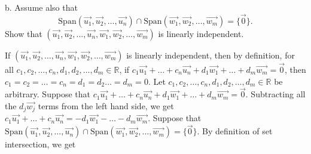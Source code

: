 \documentclass[12pt]{article}
\newenvironment{problem}[2][Problem]
{
	\begin{trivlist} 
		\item[\hskip \labelsep {\bfseries #1 #2:}]
	}
{
	\end{trivlist}
	}
\newenvironment{solution}[1][Solution]
{
	\begin{trivlist} 
		\item[\hskip \labelsep {\itshape #1:}]
	}
	{
	\end{trivlist}
}
\begin{document}
\begin{problem}{3}
\begin{solution}
%
%
%
%
%
%
%
%
%
\end{solution}
\noindent
\newline
\newline
b. Assume also that
\[
\text{Span}(\vec{u_1},\vec{u_2}, \dots , \vec{u_n}) \cap \text{Span}(\vec{w_1},\vec{w_2}, \dots , \vec{w_m}) = \{\vec{0}\}\text{.}
\]
Show that $(\vec{u_1},\vec{u_2}, \dots , \vec{u_n},\vec{w_1},\vec{w_2}, \dots , \vec{w_m})$ is linearly independent.
\begin{solution} If $(\vec{u_1},\vec{u_2}, \dots , \vec{u_n},\vec{w_1},\vec{w_2}, \dots , \vec{w_m})$ is linearly independent, then by definition, for all $c_1,c_2,\dots,c_n,d_1,d_2,\dots,d_m \in \mathbb{R}$, if $c_1\vec{u_1} + \dots + c_n \vec{u_n} + d_1 \vec{w_1} +\dots + d_m \vec{w_m} = \vec{0}$, then $c_1=c_2=\dots=c_n=d_1=d_2\dots=d_m=0$. Let $c_1,c_2,\dots,c_n,d_1,d_2,\dots,d_m \in \mathbb{R}$ be arbitrary. Suppose that $c_1\vec{u_1} + \dots + c_n \vec{u_n} + d_1 \vec{w_1} +\dots + d_m \vec{w_m} = \vec{0}$. Subtracting all the $d_j\vec{w_j}$ terms from the left hand side, we get $c_1 \vec{u_1} + \dots + c_n \vec{u_n} = -d_1 \vec{w_1} - \dots -d_m \vec{w_m}$. Suppose that $\text{Span}(\vec{u_1},\vec{u_2}, \dots , \vec{u_n}) \cap \text{Span}(\vec{w_1},\vec{w_2}, \dots , \vec{w_m}) = \{\vec{0}\}$. By definition of set intersection, we get

\end{solution}
\end{problem}
\end{document}
